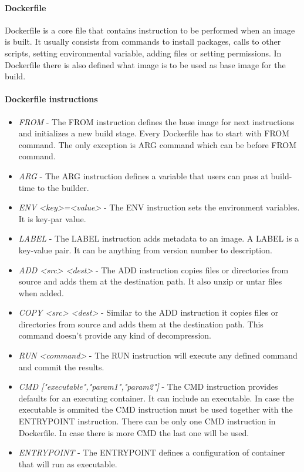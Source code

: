 \documentclass[12pt,a4paper]{article}
\begin{document}
\paragraph{Dockerfile}
Dockerfile is a core file that contains instruction to be performed when an image is built. It usually consists from commands to install
packages, calls to other scripts, setting environmental variable, adding files or setting permissions. In Dockerfile there is also defined 
what image is to be used as base image for the build.

\paragraph{Dockerfile instructions}
\begin{itemize}
\item \textit{FROM} - The FROM instruction defines the base image for next instructions and initializes a new build stage. Every Dockerfile
has to start with FROM command. The only exception is ARG command which can be before FROM command.
\item \textit{ARG} - The ARG instruction defines a variable that users can pass at build-time to the builder.
\item \textit{ENV <key>=<value>} - The ENV instruction sets the environment variables. It is key-par value. 
\item \textit{LABEL} - The LABEL instruction adds metadata to an image. A LABEL is a key-value pair. It can be anything from version number to description.
\item \textit{ADD <src> <dest>} - The ADD instruction copies files or directories from source and adds them at the destination path. It also
unzip or untar files when added.
\item \textit{COPY <src> <dest>} - Similar to the ADD instruction it copies files or directories from source and adds them at the destination path. This command doesn't provide any kind of decompression.
\item \textit{RUN <command>} - The RUN instruction will execute any defined command and commit the results.
\item \textit{CMD ["executable","param1","param2"]} - The CMD instruction provides defaults for an executing container. It can include an
executable. In case the executable is ommited the CMD instruction must be used together with the ENTRYPOINT instruction. There can be only
one CMD instruction in Dockerfile. In case there is more CMD the last one will be used.
\item \textit{ENTRYPOINT} - The ENTRYPOINT defines a configuration of container that will run as executable.

\end{itemize}
\end{document}
